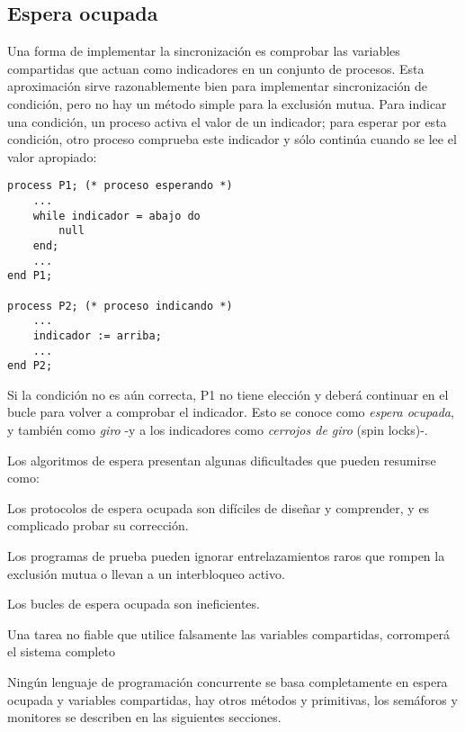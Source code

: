 \subsection{Espera ocupada}

Una forma de implementar la sincronización es comprobar las variables
compartidas que actuan como indicadores en un conjunto de procesos. Esta
aproximación sirve razonablemente bien para implementar sincronización de
condición, pero no hay un método simple para la exclusión mutua. Para indicar
una condición, un proceso activa el valor de un indicador; para esperar por esta
condición, otro proceso comprueba este indicador y sólo continúa cuando se lee
el valor apropiado:

\begin{lstlisting}
process P1; (* proceso esperando *)
	...
	while indicador = abajo do
		null
	end;
	...
end P1;

process P2; (* proceso indicando *)
	...
	indicador := arriba;
	...
end P2;
\end{lstlisting}

Si la condición no es aún correcta, P1 no tiene elección y deberá continuar en
el bucle para volver a comprobar el indicador. Esto se conoce como \emph{espera
ocupada}, y también como \emph{giro} -y a los indicadores como \emph{cerrojos de
giro} (spin locks)-.

Los algoritmos de espera presentan algunas dificultades que pueden resumirse
como:

\begin{iterate}
\item Los protocolos de espera ocupada son difíciles de diseñar y comprender, y
	es complicado probar su corrección.
\item Los programas de prueba pueden ignorar entrelazamientos raros que rompen
	la exclusión mutua o llevan a un interbloqueo activo.
\item Los bucles de espera ocupada son ineficientes.
\item Una tarea no fiable que utilice falsamente las variables compartidas,
	corromperá el sistema completo
\end{iterate}

Ningún lenguaje de programación concurrente se basa completamente en espera
ocupada y variables compartidas, hay otros métodos y primitivas, los semáforos y
monitores se describen en las siguientes secciones.
